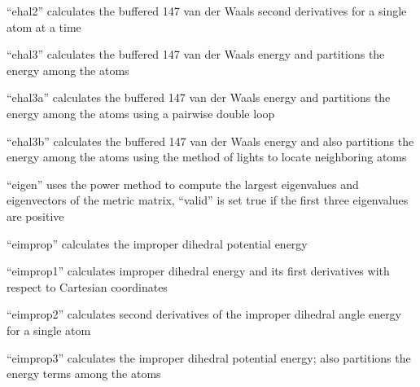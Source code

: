 \documentclass[letterpaper,11pt,english]{sphinxmanual}
\begin{document}

“ehal2” calculates the buffered 14\sphinxhyphen{}7 van der Waals second derivatives for a single atom at a time


“ehal3” calculates the buffered 14\sphinxhyphen{}7 van der Waals energy and partitions the energy among the atoms


“ehal3a” calculates the buffered 14\sphinxhyphen{}7 van der Waals energy and partitions the energy among the atoms using a pairwise double loop


“ehal3b” calculates the buffered 14\sphinxhyphen{}7 van der Waals energy and also partitions the energy among the atoms using the method of lights to locate neighboring atoms


“eigen” uses the power method to compute the largest eigenvalues and eigenvectors of the metric matrix, “valid” is set true if the first three eigenvalues are positive







“eimprop” calculates the improper dihedral potential energy


“eimprop1” calculates improper dihedral energy and its first derivatives with respect to Cartesian coordinates


“eimprop2” calculates second derivatives of the improper dihedral angle energy for a single atom


“eimprop3” calculates the improper dihedral potential energy; also partitions the energy terms among the atoms

\end{document}
